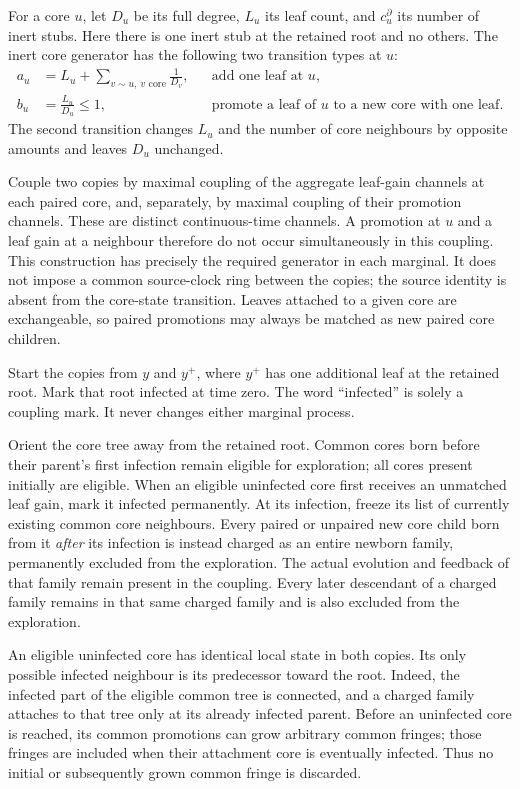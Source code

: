 For a core $u$, let $D_u$ be its full degree, $L_u$ its leaf count,
and $c_u^\partial$ its number of inert stubs.  Here there is one inert
stub at the retained root and no others.  The inert core generator has
the following two transition types at $u$:
\begin{align}
 a_u&=L_u+\sum_{v\sim u,\ v\text{ core}}\frac1{D_v},
 &&\text{add one leaf at }u,\label{erc:gain-rate}\\
 b_u&=\frac{L_u}{D_u}\le1,
 &&\text{promote a leaf of }u\text{ to a new core with one leaf}.
 \label{erc:bud-rate}
\end{align}
The second transition changes $L_u$ and the number of core neighbours
by opposite amounts and leaves $D_u$ unchanged.

Couple two copies by maximal coupling of the aggregate leaf-gain
channels at each paired core, and, separately, by maximal coupling of
their promotion channels.  These are distinct continuous-time channels.
A promotion at $u$ and a leaf gain at a neighbour therefore do not
occur simultaneously in this coupling.  This construction has precisely
the required generator in each marginal.  It does not impose a common
source-clock ring between the copies; the source identity is absent
from the core-state transition.  Leaves attached to a given core are
exchangeable, so paired promotions may always be matched as new paired
core children.

Start the copies from $y$ and $y^+$, where $y^+$ has one additional
leaf at the retained root.  Mark that root infected at time zero.
The word ``infected'' is solely a coupling mark.  It never changes
either marginal process.

Orient the core tree away from the retained root.  Common cores born
before their parent's first infection remain eligible for exploration;
all cores present initially are eligible.
When an eligible uninfected core first receives an unmatched leaf gain,
mark it infected permanently.  At its infection, freeze its list of
currently existing common core neighbours.  Every paired or unpaired
new core child born from it \emph{after} its infection is instead
charged as an entire newborn family, permanently excluded from the
exploration.  The actual evolution and feedback of that family remain
present in the coupling.
Every later descendant of a charged family remains in that same
charged family and is also excluded from the exploration.

An eligible uninfected core has identical local state in both copies.
Its only possible infected neighbour is its predecessor toward the
root.  Indeed, the infected part of the eligible common tree is
connected, and a charged family attaches to that tree only at its
already infected parent.  Before an uninfected core is reached, its
common promotions can grow arbitrary common fringes; those fringes
are included when their attachment core is eventually infected.
Thus no initial or subsequently grown common fringe is discarded.


